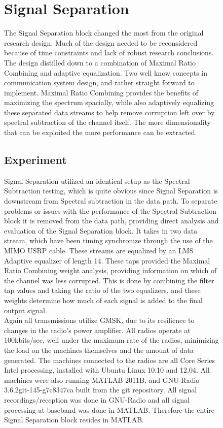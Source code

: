 \begin{figure}
\section{Signal Separation}

The Signal Separation block changed the most from the original research design.  Much of the design needed to be reconsidered because of time constraints and lack of robust research conclusions.  The design distilled down to a combination of Maximal Ratio Combining and adaptive equalization.  Two well know concepts in communication system design, and rather straight forward to implement.  Maximal Ratio Combining provides the benefits of maximizing the spectrum spacially, while also adaptively equalizing these separated data streams to help remove corruption left over by spectral subtraction of the channel itself.  The more dimensionality that can be exploited the more performance can be extracted.\\

\subsection{Experiment}

Signal Separation utilized an identical setup as the Spectral Subtraction testing, which is quite obvious since Signal Separation is downstream from Spectral subtraction in the data path.  To separate problems or issues with the performance of the Spectral Subtraction block it is removed from the data path, providing direct analysis and evaluation of the Signal Separation block.  It takes in two data stream, which have been timing synchronize through the use of the MIMO USRP cable.  These streams are equalized by an LMS Adaptive equalizer of length 14.  These taps provided the Maximal Ratio Combining weight analysis, providing information on which of the channel was less corrupted.  This is done by combining the filter tap values and taking the ratio of the two equalizers, and these weights determine how much of each signal is added to the final output signal.\\ 

Again all transmissions utilize GMSK, due to its resilience to changes in the radio's power amplifier.  All radios operate at 100kbits/sec, well under the maximum rate of the radios, minimizing the load on the machines themselves and the amount of data generated.  The machines connected to the radios are all Core Series Intel processing, installed with Ubuntu Linux 10.10 and 12.04.  All machines were also running MATLAB 2011B, and GNU-Radio 3.6.2git-145-g7c8347ca built from the git repository.  All signal recordings/reception was done in GNU-Radio and all signal processing at baseband was done in MATLAB.  Therefore the entire Signal Separation block resides in MATLAB.\\  


\end{figure}
